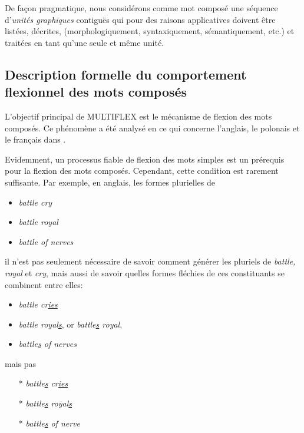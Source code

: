 \bigskip
\noindent De façon pragmatique, nous considérons comme mot composé une séquence d'\textit{unités
 graphiques} contiguës  qui pour des raisons applicatives doivent être
 listées, décrites, (morphologiquement, syntaxiquement, sémantiquement, etc.) et traitées en tant
 qu'une seule et même unité.

 \subsection{Description formelle du comportement flexionnel des mots composés}
\label{subsec:MWUs inflection}
L'objectif principal de MULTIFLEX est le  mécanisme de flexion des mots composés.
Ce phénomène a été analysé en ce qui concerne l'anglais, le polonais et le français dans
\cite{these-Savary}.

\bigskip
\noindent Evidemment, un processus fiable de flexion des mots simples est un prérequis pour la
flexion des mots composés. Cependant, cette condition est rarement suffisante. Par exemple, en anglais, les
formes plurielles de 

\begin{itemize}
\item \emph{battle cry}
\item \emph{battle royal}
\item \emph{battle of nerves}
\end{itemize}

\noindent  il n'est pas seulement nécessaire de savoir comment générer les pluriels de 
\emph{battle, royal} et \emph{cry}, mais aussi de savoir quelles formes fléchies de ces constituants
se combinent entre elles:

\begin{itemize}
\item \emph{battle cr\underline{ies}}
\item \emph{battle royal\underline{s}}, or \emph{battle\underline{s} royal},
\item \emph{battle\underline{s} of nerves}
\end{itemize}

\noindent mais pas
 
\begin{itemize}
\item[*] {\emph{battle\underline{s} cr\underline{ies}}}
\item[*] {\emph{battle\underline{s} royal\underline{s}}}
\item[*] {\emph{battle\underline{s} of nerve\underline{ }}}
\end{itemize}

